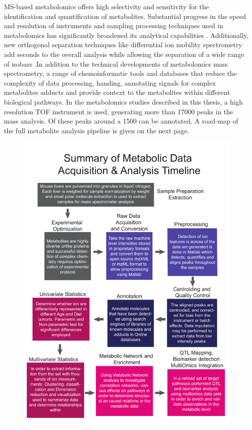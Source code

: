\documentclass[a4paper,11pt,twoside]{book}
\begin{document}
	MS-based metabolomics offers high selectivity and sensitivity for the identification and quantification of metabolites. Substantial progress in the speed and resolution of instruments and sampling processing techniques used in metabolomics has significantly broadened its analytical capabilities \citep{Aksenov2017GlobalSpectrometry}. Additionally, new orthogonal separation techniques like differential ion mobility spectrometry add seconds to the overall analysis while allowing the separation of a wide range of isobars \citep{Domalain2014EnantiomericSpectrometry}.In addition to the technical developments of metabolomics mass spectrometry, a range of chemoinformatic tools and databases that reduce the complexity of data processing, handing\citep{Xia2016UsingAnalysis}, annotating signals for complex metabolites adducts and provide context to the metabolites within different biological pathways\citep{Wishart2013HMDB2013,Xia2010MSEA}. In the metabolomics studies described in this thesis, a high resolution TOF instrument is used, generating more than 17000 peaks in the mass analysis. Of these peaks around a 1500 can be annotated. A road-map of the full metabolite analysis pipeline is given on the next page.
	
	
	
	\begin{figure}[t!]
		\includegraphics[width=1.2\linewidth]{3.Metabolomics/pipeline.pdf}
		\label{OverviewMetabolicsPipe}
	\end{figure}
\end{document}
